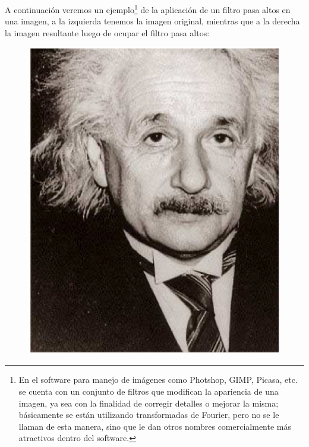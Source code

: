 A continuación veremos un ejemplo\footnote{En el software para manejo de imágenes como Photshop, GIMP, Picasa, etc. se cuenta con un conjunto de filtros que modifican la apariencia de una imagen, ya sea con la finalidad de corregir detalles o mejorar la misma; básicamente se están utilizando transformadas de Fourier, pero no se le llaman de esta manera, sino que le dan otros nombres comercialmente más atractivos dentro del software.} de la aplicación de un filtro pasa altos en una imagen, a la izquierda tenemos la imagen original, mientras que a la derecha la imagen resultante luego de ocupar el filtro pasa altos:
\begin{figure}[H]
    \centering
    \includegraphics[scale=0.35]{Imagenes/Einstein_01.eps}

\end{figure}

